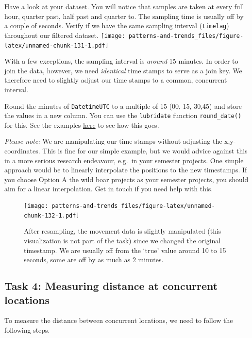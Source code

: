 \documentclass[]{book}
\begin{document}
Have a look at your dataset. You will notice that samples are taken at every full hour, quarter past, half past and quarter to. The sampling time is usually off by a couple of seconds. Verify if we have the same sampling interval (\texttt{timelag}) throughout our filtered dataset.
\texttt{[image: patterns-and-trends\_files/figure-latex/unnamed-chunk-131-1.pdf]}

With a few exceptions, the sampling interval is \emph{around} 15 minutes. In order to join the data, however, we need \emph{identical} time stamps to serve as a join key. We therefore need to slightly adjust our time stamps to a common, concurrent interval.

Round the minutes of \texttt{DatetimeUTC} to a multiple of 15 (00, 15, 30,45) and store the values in a new column. You can use the \texttt{lubridate} function \texttt{round\_date()} for this. See the examples \href{https://lubridate.tidyverse.org/reference/round_date.html}{here} to see how this goes.

\emph{Please note:} We are manipulating our time stamps without adjusting the x,y-coordinates. This is fine for our simple example, but we would advice against this in a more serious research endeavour, e.g.~in your semester projects. One simple approach would be to linearly interpolate the positions to the new timestamps. If you choose Option A the wild boar projects as your semester projects, you should aim for a linear interpolation. Get in touch if you need help with this.

\begin{figure}
\centering
\texttt{[image: patterns-and-trends\_files/figure-latex/unnamed-chunk-132-1.pdf]}
\caption{\label{fig:unnamed-chunk-132}After resampling, the movement data is slightly manipulated (this visualization is not part of the task) since we changed the original timestamp. We are usually off from the `true' value around 10 to 15 seconds, some are off by as much as 2 minutes.}
\end{figure}

\hypertarget{task-4-measuring-distance-at-concurrent-locations}{%
\subsection{Task 4: Measuring distance at concurrent locations}\label{task-4-measuring-distance-at-concurrent-locations}}

To measure the distance between concurrent locations, we need to follow the following steps.
\end{document}
